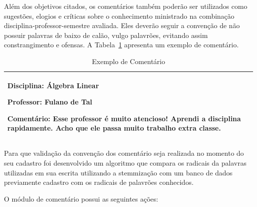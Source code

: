 \documentclass[12pt, a4paper]{report}
\begin{document}
Além dos objetivos citados, os comentários também poderão ser utilizados como sugestões, elogios e críticas sobre o conhecimento ministrado na combinação disciplina-professor-semestre avaliada. Eles deverão seguir a convenção de não possuir palavras de baixo de calão, vulgo palavrões, evitando assim constrangimento e ofensas. A Tabela~\ref{tab:comentario} apresenta um exemplo de comentário.

\begin{table}[h]
 \centering
 {\renewcommand\arraystretch{1.25}
 \begin{tabular}{ l l }
  \cline{1-1}\cline{2-2}  
    \multicolumn{1}{|p{7.850cm}|}{\par \textbf{Disciplina:} Álgebra Linear
    \par \textbf{Professor:} Fulano de Tal
    \par \textbf{Comentário:} Esse professor é muito atencioso! Aprendi a disciplina rapidamente. Acho que ele passa muito trabalho extra classe.}
  \\  
  \hline
 \end{tabular}}
 \caption{Exemplo de Comentário}
 \label{tab:comentario}
\end{table}

Para que validação da convenção dos comentário seja realizada no momento do seu cadastro foi desenvolvido um algoritmo que compara os radicais da palavras utilizadas em sua escrita utilizando a stemmização com um banco de dados previamente cadastro com os radicais de palavrões conhecidos. 

O módulo de comentário possui as seguintes ações:
\end{document}
